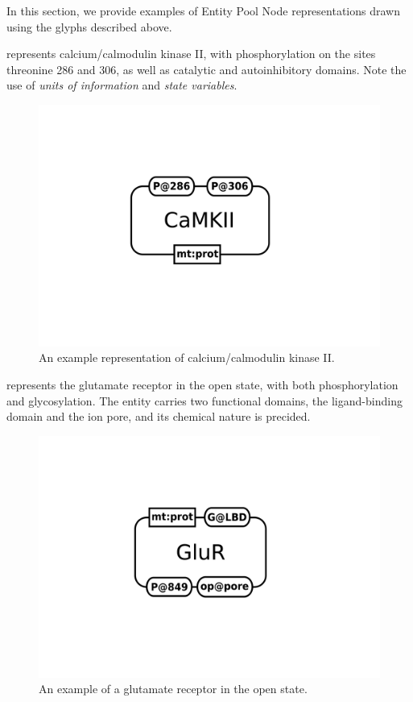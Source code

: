 In this section, we provide examples of Entity Pool Node representations drawn using the \SBGNPDLone glyphs described above.

 represents calcium/calmodulin kinase II, with phosphorylation on the sites threonine 286 and 306, as well as catalytic and autoinhibitory domains.  Note the use of \emph{units of information} and \emph{state variables}.

\begin{figure}[htb]
  \centering
  \includegraphics[scale = 0.3]{examples/macromolecule-CaMKII}
  \caption{An example representation of calcium/calmodulin kinase II.}
  \label{fig:techref:example-camkii}
\end{figure}

 represents the glutamate receptor in the open state, with both phosphorylation and glycosylation.  The entity carries two functional domains, the ligand-binding domain and the ion pore, and its chemical nature is precided.

\begin{figure}[htb]
  \centering
  \includegraphics[scale = 0.3]{examples/macromolecule-GluR}
  \caption{An example of a glutamate receptor in the open state.}
  \label{fig:techref:example-glur}
\end{figure}


